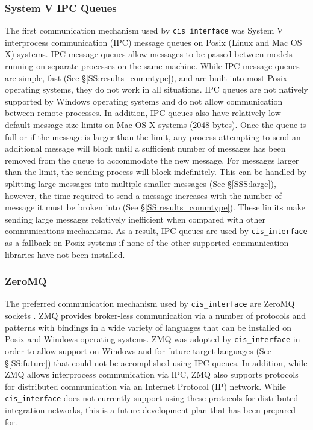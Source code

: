 \documentclass[journal]{IEEEtran}
\newcommand{\cis}{{\tt cis\_interface}{}}
\begin{document}
\subsubsection{System V IPC Queues}\label{SSS:ipc}
%
The first communication mechanism used by {\cis} was System V interprocess 
communication (IPC) message queues \citep{Rusling1999} on Posix (Linux and Mac OS X) systems. 
IPC message queues allow messages to be passed between models running on separate 
processes on the same machine. While IPC message queues are simple, fast 
(See \S\ref{SS:results_commtype}), and are built into most Posix operating systems, they do not work in all 
situations. IPC queues are not natively supported by Windows operating systems 
and do not allow communication between remote processes. In addition, IPC queues also 
have relatively low default message size limits on Mac OS X systems (2048 bytes). Once 
the queue is full or if the message is larger than the limit, any process attempting to send an additional message will block until a 
sufficient number of messages has been removed from the queue to accommodate the new message. 
For messages larger than the limit, the sending process will block indefinitely. 
This can be handled by splitting large messages into multiple smaller messages 
(See \S\ref{SSS:large}), however, the time required to send a message increases with the number of 
message it must be broken into (See \S\ref{SS:results_commtype}). These limits make sending large messages 
relatively inefficient when compared with other communications mechanisms. 
As a result, IPC queues are used by 
{\cis} as a fallback on Posix systems if none of the other supported communication libraries have 
not been installed.

\subsubsection{ZeroMQ}\label{SSS:zmq}
%
The preferred communication mechanism used by {\cis} are ZeroMQ sockets 
\citep[ZMQ][]{Akgul2013}. ZMQ 
provides broker-less communication via a number of protocols and patterns with 
bindings in a wide variety of languages that can be installed on Posix and Windows 
operating systems. ZMQ was adopted by {\cis} in order to allow support 
on Windows and for future target languages (See \S\ref{SS:future}) that could not be 
accomplished using IPC queues. In addition, while ZMQ allows 
interprocess communication via IPC, ZMQ also 
supports protocols for distributed communication via an Internet Protocol (IP) 
network. While {\cis} does not currently support using these protocols 
for distributed integration networks, this is a future development plan that has been prepared for.
\end{document}
